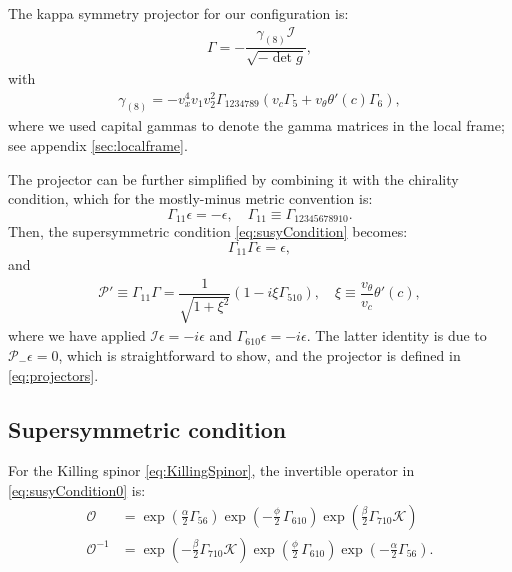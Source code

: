 The kappa symmetry projector for our configuration is:
\begin{align}
\Gamma = - \dfrac{ \gamma_{(8)} \mathcal{I} }{\sqrt{-\det g}},
\end{align}
with
\begin{align}
 \gamma_{(8)} = - v_x^4 v_1 v_2^2 \Gamma_{1 2 3 4 7 8 9}( v_c \Gamma_5 +  v_{\theta} \theta'(c) \Gamma_6), 
\end{align}
where we used capital gammas to denote the gamma matrices in the local frame; see appendix \ref{sec:localframe}.

The projector can be further simplified by combining it with the chirality condition, which for the mostly-minus metric convention is: 
\begin{equation}
 \Gamma_{11} \epsilon = -\epsilon, \quad 
 \Gamma_{11} \equiv \Gamma_{12345678910}.
\end{equation}
Then, the supersymmetric condition \eqref{eq:susyCondition} becomes:
\begin{equation}
 \Gamma_{11} \Gamma \epsilon = \epsilon,
\end{equation}
and 
\begin{align} \label{eq:newProjector}
  \mathcal{P}' \equiv \Gamma_{11} \Gamma  = \dfrac{1}{\sqrt{1+\xi^2}}(1- i \xi  \Gamma_{510}), \quad 
   \xi \equiv  \dfrac{v_\theta}{v_c} \theta'(c),
\end{align}
where we have applied $\mathcal{I} \epsilon = -i\epsilon$ and $\Gamma_{610} \epsilon = -i \epsilon$. The latter identity is due to $\mathcal{P}_- \epsilon = 0$, which is straightforward to show, and the projector is defined in \eqref{eq:projectors}.


\subsection{Supersymmetric condition}

For the Killing spinor \eqref{eq:KillingSpinor}, the invertible operator in \eqref{eq:susyCondition0} is:
\begin{align}
 \mathcal{O} &= \exp{\left(\frac{\alpha}{2}\Gamma_{56} \right)} \exp{\left(-\frac{\phi}{2}\, \Gamma_{610} \right)} \exp{\left(\frac{\beta}{2}\Gamma_{710} \mathcal{K} \right)} \\
 \mathcal{O}^{-1} &=  \exp{\left(-\frac{\beta}{2}\Gamma_{710} \mathcal{K} \right)} 
 \exp{\left(\frac{\phi}{2}\, \Gamma_{610} \right)} 
 \exp{\left(-\frac{\alpha}{2}\Gamma_{56} \right)}.
\end{align}


